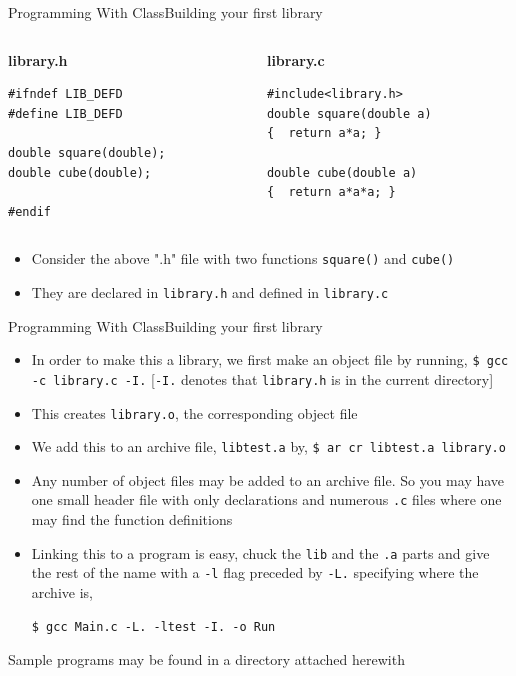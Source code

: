 \documentclass{beamer}
\begin{document}
\begin{frame}[fragile]{Programming With Class}{Building your first library}
\begin{columns}
\begin{column}{0.5\textwidth}
\textbf{library.h}
\begin{verbatim}
#ifndef LIB_DEFD
#define LIB_DEFD

double square(double);
double cube(double);

#endif
\end{verbatim}
\end{column}
\begin{column}{0.5\textwidth}
\textbf{library.c}
\begin{verbatim}
#include<library.h>
double square(double a)
{  return a*a; }

double cube(double a)
{  return a*a*a; }
\end{verbatim}
\end{column}
\end{columns}
\begin{itemize}
\item Consider the above ".h" file with two functions \verb|square()| and \verb|cube()|
\item They are declared in \verb|library.h| and defined in \verb|library.c|
\end{itemize}
\end{frame}

\begin{frame}[fragile]{Programming With Class}{Building your first library}
\begin{itemize}
\item In order to make this a library, we first make an object file by running, \verb|$ gcc -c library.c -I.| [\verb|-I.| denotes that \verb|library.h| is in the current directory]
\item This creates \verb|library.o|, the corresponding object file
\item We add this to an archive file, \verb|libtest.a| by, \verb|$ ar cr libtest.a library.o|
\item Any number of object files may be added to an archive file. So you may have one small header file with only declarations and numerous \verb|.c| files where one may find the function definitions
\item Linking this to a program is easy, chuck the \verb|lib| and the \verb|.a| parts and give the rest of the name with a \verb|-l| flag preceded by \verb|-L.| specifying where the archive is,
\begin{verbatim}
$ gcc Main.c -L. -ltest -I. -o Run
\end{verbatim}
\end{itemize}
\begin{small}
Sample programs may be found in a directory attached herewith
\end{small}
\end{frame}
\end{document}
